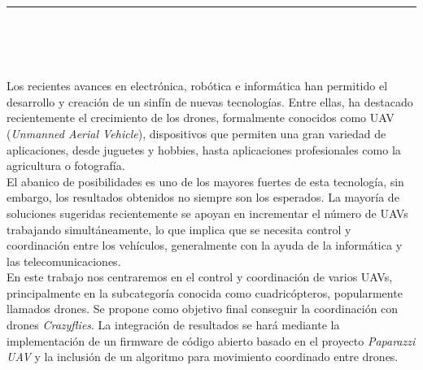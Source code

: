 \chapter*{}

\thispagestyle{empty}


\begin{center}
    {\Large\bfseries \myTitle} \\[2mm]
    \myName \\
\end{center}

\noindent\rule[-1ex]{\textwidth}{1pt}\\[3ex]

 \\

\vspace{3mm}

 \\

Los recientes avances en electrónica, robótica e informática han permitido el desarrollo y creación de un sinfín de nuevas tecnologías.
Entre ellas, ha destacado recientemente el crecimiento de los drones, formalmente conocidos como UAV (\textit{Unmanned Aerial Vehicle}), 
dispositivos que permiten una gran variedad de aplicaciones, desde juguetes y hobbies, hasta aplicaciones profesionales como la agricultura o fotografía. \\

El abanico de posibilidades es uno de los mayores fuertes de esta tecnología, sin embargo, los resultados obtenidos no siempre son los esperados. 
La mayoría de soluciones sugeridas recientemente se apoyan en incrementar el número de UAVs trabajando simultáneamente, lo que implica que se necesita control y coordinación entre los vehículos, 
generalmente con la ayuda de la informática y las telecomunicaciones. \\

En este trabajo nos centraremos en el control y coordinación de varios UAVs, principalmente en la subcategoría conocida como cuadricópteros, popularmente llamados drones.  
Se propone como objetivo final conseguir la coordinación con drones \textit{Crazyflies}.
La integración de resultados se hará mediante la implementación de un firmware de código abierto basado en el proyecto \textit{Paparazzi UAV} y la inclusión de un algoritmo para movimiento coordinado entre drones.

